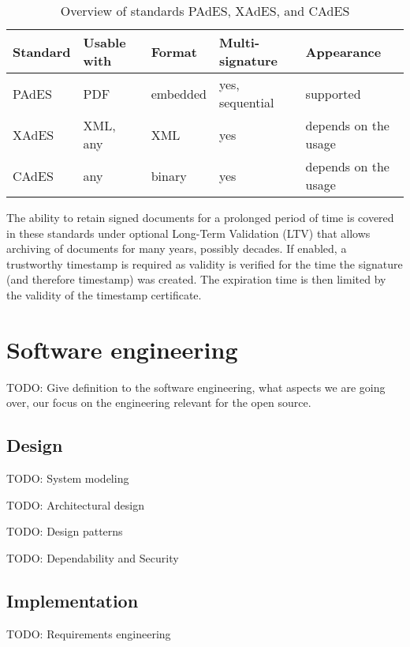 \documentclass[thesismargins, english, thesislinespacing, twoside, openright, upjsfrontpage]{rnthesis}
\begin{document}
\begin{table}[h!]
  \begin{tabular}{ |p{2cm}||p{2.2cm}|p{2cm}|p{3cm}|p{3.9cm}| }
    \hline
    Standard & Usable with & Format & Multi-signature & Appearance \\
    \hline
    PAdES & PDF                  & embedded         & yes, sequential    & supported            \\
    XAdES & XML, any             & XML              & yes                & depends on the usage \\
    CAdES & any                  & binary           & yes                & depends on the usage \\
    \hline
  \end{tabular}

  \caption{Overview of standards PAdES, XAdES, and CAdES}
  \label{table:1}
\end{table}

The ability to retain signed documents for a prolonged period of time is covered in these standards under optional Long-Term Validation (LTV) that allows archiving of documents for many years, possibly decades.
If enabled, a trustworthy timestamp is required as validity is verified for the time the signature (and therefore timestamp) was created.
The expiration time is then limited by the validity of the timestamp certificate.

\section{Software engineering}

TODO: Give definition to the software engineering, what aspects we are going over, our focus on the engineering relevant for the open source.

\subsection{Design}

TODO: System modeling

TODO: Architectural design

TODO: Design patterns

TODO: Dependability and Security

\subsection{Implementation}

TODO: Requirements engineering
\end{document}
